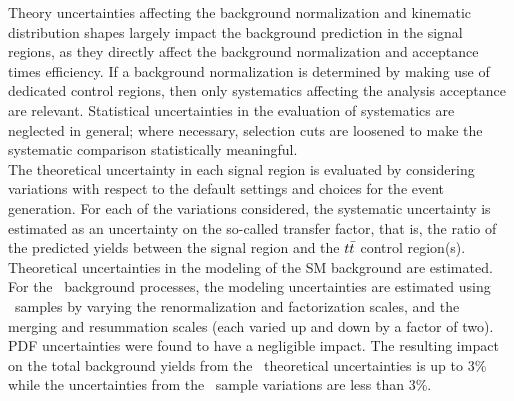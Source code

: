 Theory uncertainties affecting the background normalization and kinematic distribution shapes largely impact the background prediction in the signal regions, as they directly affect the background normalization and acceptance times efficiency. If a background normalization is determined by making use of dedicated control regions, then only systematics affecting the analysis acceptance are relevant. Statistical uncertainties in the evaluation of systematics are neglected in general; where necessary, selection cuts are loosened to make the systematic comparison statistically meaningful.  \\

The theoretical uncertainty in each signal region is evaluated by
considering variations with respect to the default settings and choices for the event generation. For each of the variations considered, the systematic uncertainty is estimated as an uncertainty on the so-called transfer factor, that is, the ratio of the predicted yields between the signal region and the $t\bar{t}$ control region(s). \\

Theoretical uncertainties in the modeling of the SM background are
estimated. For the \Vjets\ background processes, the modeling uncertainties
are estimated using \sherpa\ samples by varying the renormalization and
factorization scales, and the merging 
and resummation
scales (each varied up and down by a
factor of two). PDF uncertainties were found to have a negligible impact. The resulting impact on the total background yields from the
\Zjets\ theoretical uncertainties is up to 3\% while the uncertainties from the \Wjets\ sample variations are less than 3\%.  \\\

